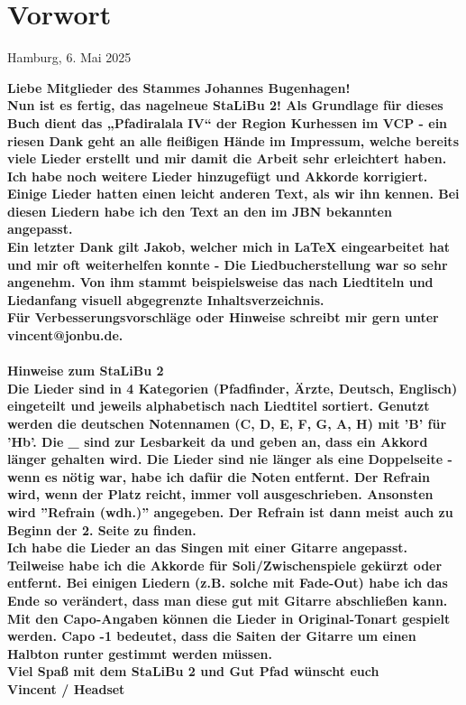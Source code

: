 \section*{Vorwort}

\begin{flushright}
    Hamburg, 6. Mai 2025
\end{flushright}


\bf Liebe Mitglieder des Stammes Johannes Bugenhagen! \sf \\

Nun ist es fertig, das nagelneue StaLiBu 2! Als Grundlage für dieses Buch dient das „Pfadiralala IV“ der Region Kurhessen im VCP - ein riesen Dank geht an alle fleißigen Hände im Impressum, welche bereits viele Lieder erstellt und mir damit die Arbeit sehr erleichtert haben. \\

Ich habe noch weitere Lieder hinzugefügt und Akkorde korrigiert. Einige Lieder hatten einen leicht anderen Text, als wir ihn kennen. Bei diesen Liedern habe ich den Text an den im JBN bekannten angepasst. \\

Ein letzter Dank gilt Jakob, welcher mich in LaTeX eingearbeitet hat und mir oft weiterhelfen konnte - Die Liedbucherstellung war so sehr angenehm. Von ihm stammt beispielsweise das nach Liedtiteln und Liedanfang visuell abgegrenzte Inhaltsverzeichnis. \\

Für Verbesserungsvorschläge oder Hinweise schreibt mir gern unter vincent@jonbu.de. \\ \\

\bf Hinweise zum StaLiBu 2 \sf \\

Die Lieder sind in 4 Kategorien (Pfadfinder, Ärzte, Deutsch, Englisch) eingeteilt und jeweils alphabetisch nach Liedtitel sortiert. Genutzt werden die deutschen Notennamen (C, D, E, F, G, A, H) mit 'B' für 'Hb'. \newline
Die \_ sind zur Lesbarkeit da und geben an, dass ein Akkord länger gehalten wird. Die Lieder sind nie länger als eine Doppelseite - wenn es nötig war, habe ich dafür die Noten entfernt. Der Refrain wird, wenn der Platz reicht, immer voll ausgeschrieben. Ansonsten wird ''Refrain (wdh.)'' angegeben. Der Refrain ist dann meist auch zu Beginn der 2. Seite zu finden. \\

Ich habe die Lieder an das Singen mit einer Gitarre angepasst. Teilweise habe ich die Akkorde für Soli/Zwischenspiele gekürzt oder entfernt. Bei einigen Liedern (z.B. solche mit Fade-Out) habe ich das Ende so verändert, dass man diese gut mit Gitarre abschließen kann.
Mit den Capo-Angaben können die Lieder in Original-Tonart gespielt werden. Capo -1 bedeutet, dass die Saiten der Gitarre um einen Halbton runter gestimmt werden müssen. \\

Viel Spaß mit dem StaLiBu 2 und Gut Pfad wünscht euch\\
Vincent / Headset